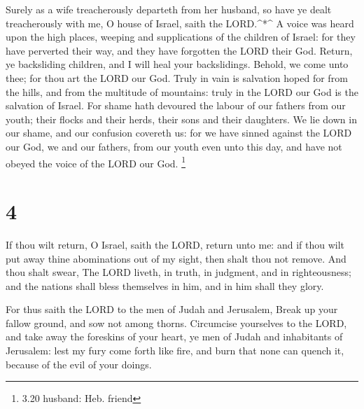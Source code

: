  Surely as a wife treacherously departeth from her husband,
so have ye dealt treacherously with me, O house of Israel, saith the
LORD.\^{}*\^{}  A voice was heard upon the high places,
weeping and supplications of the children of Israel: for they have
perverted their way, and they have forgotten the LORD their God.
 Return, ye backsliding children, and I will heal your
backslidings. Behold, we come unto thee; for thou art the LORD our God.
 Truly in vain is salvation hoped for from the hills, and
from the multitude of mountains: truly in the LORD our God is the
salvation of Israel.  For shame hath devoured the labour of
our fathers from our youth; their flocks and their herds, their sons and
their daughters.  We lie down in our shame, and our
confusion covereth us: for we have sinned against the LORD our God, we
and our fathers, from our youth even unto this day, and have not obeyed
the voice of the LORD our God. \footnote{3.20 husband: Heb. friend}

\hypertarget{section-3}{%
\section{4}\label{section-3}}

 If thou wilt return, O Israel, saith the LORD, return unto
me: and if thou wilt put away thine abominations out of my sight, then
shalt thou not remove.  And thou shalt swear, The LORD
liveth, in truth, in judgment, and in righteousness; and the nations
shall bless themselves in him, and in him shall they glory.

 For thus saith the LORD to the men of Judah and Jerusalem,
Break up your fallow ground, and sow not among thorns. 
Circumcise yourselves to the LORD, and take away the foreskins of your
heart, ye men of Judah and inhabitants of Jerusalem: lest my fury come
forth like fire, and burn that none can quench it, because of the evil
of your doings.


